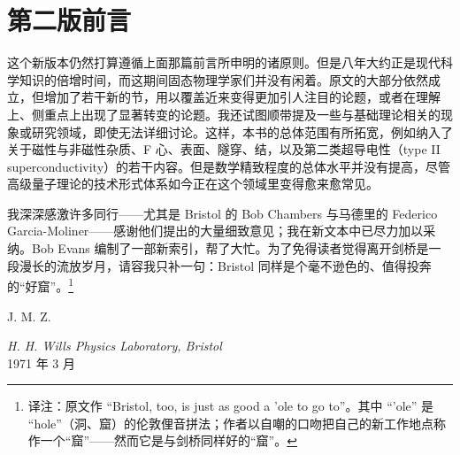 \chapter*{第二版前言}

这个新版本仍然打算遵循上面那篇前言所申明的诸原则。但是八年大约正是现代科学知识的倍增时间，而这期间固态物理学家们并没有闲着。原文的大部分依然成立，但增加了若干新的节，用以覆盖近来变得更加引人注目的论题，或者在理解上、侧重点上出现了显著转变的论题。我还试图顺带提及一些与基础理论相关的现象或研究领域，即使无法详细讨论。这样，本书的总体范围有所拓宽，例如纳入了关于磁性与非磁性杂质、F 心、表面、隧穿、结，以及第二类超导电性（type II superconductivity）的若干内容。但是数学精致程度的总体水平并没有提高，尽管高级量子理论的技术形式体系如今正在这个领域里变得愈来愈常见。

我深深感激许多同行——尤其是 Bristol 的 Bob Chambers 与马德里的 Federico Garcia-Moliner——感谢他们提出的大量细致意见；我在新文本中已尽力加以采纳。Bob Evans 编制了一部新索引，帮了大忙。为了免得读者觉得离开剑桥是一段漫长的流放岁月，请容我只补一句：Bristol 同样是个毫不逊色的、值得投奔的“好窟”。\footnote{译注：原文作 “Bristol, too, is just as good a 'ole to go to”。其中 “'ole” 是 “hole”（洞、窟）的伦敦俚音拼法；作者以自嘲的口吻把自己的新工作地点称作一个“窟”——然而它是与剑桥同样好的“窟”。}

\begin{flushright}
J. M. Z.
\end{flushright}

\noindent\emph{H. H. Wills Physics Laboratory, Bristol}\\
1971 年 3 月
